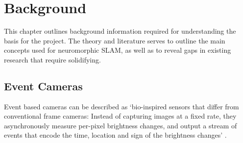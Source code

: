 \chapter{Background}



This chapter outlines background information required for understanding the basis for the project. The theory and literature serves to outline the main concepts used for neuromorphic SLAM, as well as to reveal gaps in existing research that require solidifying.

\section{Event Cameras}

Event based cameras can be described as `bio-inspired sensors that differ from conventional frame cameras: Instead of capturing images at a fixed rate, they asynchronously measure per-pixel brightness changes, and output a stream of events that encode the time, location and sign of the brightness changes' \cite{EventBasedVisionASurvery}.

